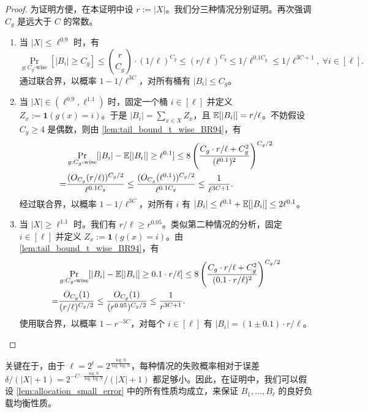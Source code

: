 \begin{proof}
    为证明方便，在本证明中设 $r := |X|$。我们分三种情况分别证明。再次强调 $C_g$ 是远大于 $C$ 的常数。
    \begin{enumerate}
        \item 当 $|X| \le \ell^{0.9}$ 时，有
        $$
        \Pr_{g : \text{$C_g$-wise}}[|B_i| \ge C_g] \le {r \choose C_g} \cdot (1 / \ell)^{C_g} \le (r / \ell)^{C_g} \le 1 / \ell^{0.1 C_g} \le 1 / \ell^{3 C + 1},\ \forall i \in [\ell].
        $$
        通过联合界，以概率 $1 - 1 / \ell^{3 C}$，对所有桶有 $|B_i| \le C_g$。

        \item 当 $|X| \in (\ell^{0.9}, \ell^{1.1})$ 时，固定一个桶 $i \in [\ell]$ 并定义 $Z_x := \mathbf{1}(g(x) = i)$。于是 $|B_i| = \sum_{x \in X} Z_x$，且 $\operatorname*{\mathbb{E}}[|B_i|] = r / \ell$。不妨假设 $C_g \ge 4$ 是偶数，则由 \cref{lem:tail_bound_t_wise_BR94}，有
        \begin{align*}
              & \Pr_{g : \text{$C_g$-wise}}[|B_i| - \operatorname*{\mathbb{E}}[|B_i|] \ge \ell^{0.1}] \le 8 \left( \frac{C_g \cdot r / \ell + C_g^2}{(\ell^{0.1})^2} \right)^{C_g / 2} \\
            = & \frac{(O_{C_g}(r / \ell))^{C_g / 2}}{\ell^{0.1 C_g}} \le \frac{(O_{C_g}(\ell^{0.1}))^{C_g / 2}}{\ell^{0.1 C_g}} \le \frac{1}{\ell^{3 C + 1}}.
        \end{align*}
        经过联合界，以概率 $1 - 1 / \ell^{3 C}$，对所有 $i$ 有 $|B_i| \le \ell^{0.1} + \operatorname*{\mathbb{E}}[|B_i|] \le 2 \ell^{0.1}$。

        \item 当 $|X| \ge \ell^{1.1}$ 时。我们有 $r / \ell \ge r^{0.05}$。类似第二种情况的分析，固定 $i \in [\ell]$ 并定义 $Z_x := \mathbf{1}(g(x) = i)$。由 \cref{lem:tail_bound_t_wise_BR94}，有
        \begin{align*}
              & \Pr_{g : \text{$C_g$-wise}}[|B_i| - \operatorname*{\mathbb{E}}[|B_i|] \ge 0.1 \cdot r / \ell] \le 8 \left( \frac{C_g \cdot r / \ell + C_g^2}{(0.1 \cdot r / \ell)^2} \right)^{C_g / 2} \\
            = & \frac{O_{C_g}(1)}{(r / \ell)^{C_g / 2}} \le \frac{O_{C_g}(1)}{(r^{0.05})^{C_g / 2}} \le \frac{1}{r^{3 C + 1}}.
        \end{align*}
        使用联合界，以概率 $1 - r^{-3 C}$，对每个 $i \in [\ell]$ 有 $|B_i| = (1 \pm 0.1) \cdot r / \ell$。
    \end{enumerate}
\end{proof}

关键在于，由于 $\ell = 2^t = 2^{\frac{\log N}{\log \log N}}$，每种情况的失败概率相对于误差 $\delta / (|X| + 1) = 2^{-C \cdot \frac{\log N}{\log \log N}} / (|X| + 1)$ 都足够小。因此，在证明中，我们可以假设 \cref{lem:allocation_small_error} 中的所有性质均成立，来保证 $B_1, \ldots, B_\ell$ 的良好负载均衡性质。

